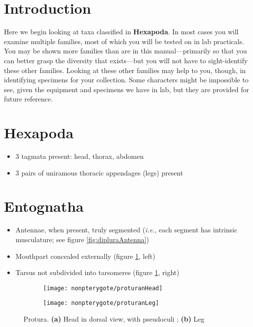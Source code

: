 \section*{Introduction}
Here we begin looking at taxa classified in \textbf{Hexapoda}. In most cases you will examine multiple families, most of which you will be tested on in lab practicals. You may be shown more families than are in this manual---primarily so that you can better grasp the diversity that exists---but you will not have to sight-identify these other families. Looking at these other families may help to you, though, in identifying specimens for your collection. Some characters might be impossible to see, given the equipment and specimens we have in lab, but they are provided for future reference.

\section{Hexapoda}

\begin{itemize}
\item 3 tagmata present: head, thorax, abdomen
\item 3 pairs of uniramous thoracic appendages (legs) present
\end{itemize}

\section*{Entognatha}

\begin{itemize}
\item Antennae, when present, truly segmented (\textit{i.e.}, each segment has intrinsic musculature; see figure \ref{fig:dipluraAntenna})
\item Mouthpart concealed externally (figure \ref{fig:proturans}, left)
\item Tarsus not subdivided into tarsomeres (figure \ref{fig:proturans}, right)
\end{itemize}

\begin{figure}[ht!]
    \centering
    \begin{subfigure}[ht!]{0.2\textwidth}
        \texttt{[image: nonpterygote/proturanHead]}
        \caption{}
        \end{subfigure}
    \hfill
    \begin{subfigure}[ht!]{0.12\textwidth}
        \texttt{[image: nonpterygote/proturanLeg]}
        \caption{}
    \end{subfigure}
    \caption{Protura. \textbf{(a)} Head in dorsal view, with pseudoculi \citep[][Fig. 1A]{Yun2016}; \textbf{(b)} Leg \cite[redrawn from][Fig. 12]{bhlpart35427}}\label{fig:proturans}
\end{figure}

